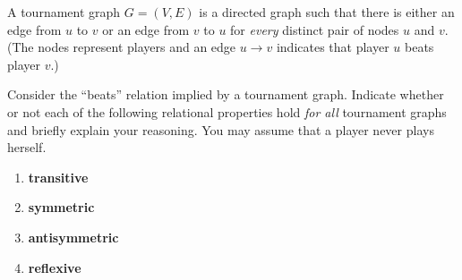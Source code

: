 \documentclass[12pt,oneside]{article}
\newcommand{\hint}[1]{({\it Hint: #1})}
\newcommand{\beats}{\rightarrow}
\begin{document}
%
\begin{problem}{10}

A tournament graph $G=(V,E)$ is a directed graph such 
that there is either an edge from $u$ to $v$ or an edge from 
$v$ to $u$ for \textit{every} distinct pair of nodes $u$ 
and $v$. (The nodes represent players and an edge $u \beats v$ 
indicates that player $u$ beats player $v$.)

%
%

Consider the ``beats'' relation implied by a tournament graph.  Indicate whether or not each of the following relational properties hold \emph{for all} tournament graphs and briefly explain your reasoning. You may assume that a player never plays herself.

\begin{enumerate}
\item {\bf transitive}

\item {\bf symmetric}

\item {\bf antisymmetric}

\item {\bf reflexive}

\end{enumerate}
\end{problem}
\end{document}
